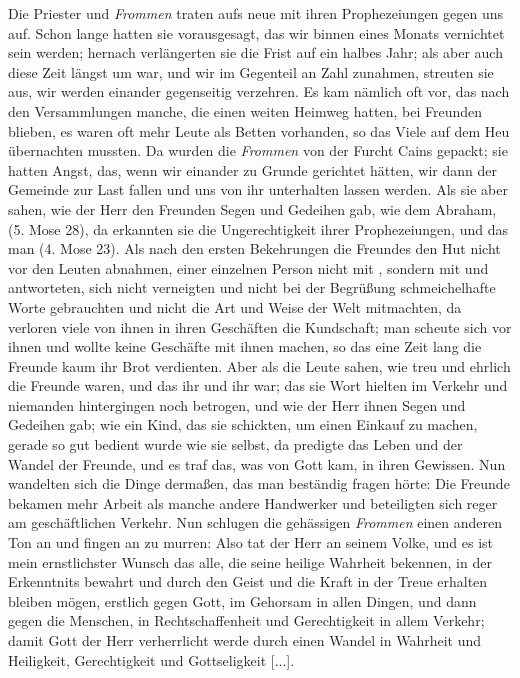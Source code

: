Die Priester und \textit{Frommen} traten aufs neue mit ihren
Prophezeiungen gegen uns auf. Schon lange hatten sie 
vorausgesagt, das wir binnen eines Monats vernichtet sein werden;
hernach verlängerten sie die Frist auf ein halbes Jahr; als aber
auch diese Zeit längst um war, und wir im Gegenteil an Zahl
zunahmen, streuten sie aus, wir werden einander gegenseitig 
verzehren. Es kam nämlich oft vor, das nach den Versammlungen
manche, die einen weiten Heimweg hatten, bei Freunden blieben,
es waren oft mehr Leute als Betten vorhanden, so das Viele auf
dem Heu übernachten mussten. Da wurden die \textit{Frommen} von
der Furcht Cains gepackt; sie hatten Angst, das, wenn wir 
einander zu Grunde gerichtet hätten, wir dann der Gemeinde zur
Last fallen und uns von ihr unterhalten lassen werden. Als sie
aber sahen, wie der Herr den Freunden Segen und Gedeihen
gab, wie dem Abraham, 
(5. Mose 28), da erkannten sie 
die Ungerechtigkeit ihrer Prophezeiungen, und das man 
(4. Mose 23). Als nach den 
ersten Bekehrungen die Freundes
den Hut nicht vor den Leuten abnahmen, einer einzelnen Person
nicht mit , sondern mit  und 
 antworteten, sich nicht
verneigten und nicht bei der Begrüßung schmeichelhafte Worte
gebrauchten und nicht die Art und Weise der Welt mitmachten, da 
verloren viele von ihnen in ihren Geschäften die Kundschaft; man
scheute sich vor ihnen und wollte keine Geschäfte mit ihnen machen,
so das eine Zeit lang die Freunde kaum ihr Brot verdienten. Aber
als die Leute sahen, wie treu und ehrlich die Freunde waren,
und das ihr  und ihr  war; 
das sie Wort hielten 
im Verkehr und niemanden hintergingen noch betrogen, und wie
der Herr ihnen Segen und Gedeihen gab; wie ein Kind, das sie
schickten, um einen Einkauf zu machen, gerade so gut bedient
wurde wie sie selbst, da predigte das Leben und der Wandel der
Freunde, und es traf das, was von Gott kam, in ihren Gewissen.
Nun wandelten sich die Dinge dermaßen, das man beständig
fragen hörte: 
 Die Freunde
bekamen mehr Arbeit als manche andere Handwerker und 
beteiligten sich reger am geschäftlichen Verkehr. Nun schlugen die
gehässigen \textit{Frommen} einen anderen Ton an und fingen an zu
murren:  Also tat
der Herr an seinem Volke, und es ist mein ernstlichster Wunsch
das alle, die seine heilige Wahrheit bekennen, in der Erkenntnits
bewahrt und durch den Geist und die Kraft in der Treue erhalten
bleiben mögen, erstlich gegen Gott, im Gehorsam in allen Dingen,
und dann gegen die Menschen, in Rechtschaffenheit und Gerechtigkeit 
in allem Verkehr; damit Gott der Herr verherrlicht werde
durch einen Wandel in Wahrheit und Heiligkeit, Gerechtigkeit und
Gottseligkeit [...].

